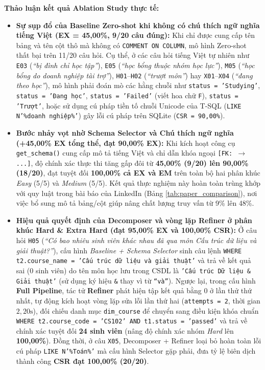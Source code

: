 \documentclass[12pt,a4paper]{report}
\begin{document}
\noindent\textbf{Thảo luận kết quả Ablation Study thực tế:}
\begin{itemize}
    \item \textbf{Sự sụp đổ của Baseline Zero-shot khi không có chú thích ngữ nghĩa tiếng Việt (EX = 45,00\%, 9/20 câu đúng):} Khi chỉ được cung cấp tên bảng và tên cột thô mà không có \texttt{COMMENT ON COLUMN}, mô hình Zero-shot thất bại trên 11/20 câu hỏi. Cụ thể, ở các câu hỏi tiếng Việt tự nhiên như \texttt{E03} (\textit{``bị đình chỉ học tập''}), \texttt{E05} (\textit{``học bổng thuộc nhóm học lực''}), \texttt{M05} (\textit{``học bổng do doanh nghiệp tài trợ''}), \texttt{H01}--\texttt{H02} (\textit{``trượt môn''}) hay \texttt{X01}--\texttt{X04} (\textit{``đang theo học''}), mô hình phải đoán mò các hằng chuỗi như \texttt{status = 'Studying'}, \texttt{status = 'Đang học'}, \texttt{status = 'Failed'} (viết hoa chữ \texttt{F}), \texttt{status = 'Trượt'}, hoặc sử dụng cú pháp tiền tố chuỗi Unicode của T-SQL (\texttt{LIKE N'\%doanh nghiệp\%'}) gây lỗi cú pháp trên SQLite (\texttt{CSR = 90,00\%}).
    \item \textbf{Bước nhảy vọt nhờ Schema Selector và Chú thích ngữ nghĩa (+45,00\% EX tổng thể, đạt 90,00\% EX):} Khi kích hoạt công cụ \texttt{get\_schema()} cung cấp mô tả tiếng Việt và chỉ dẫn khóa ngoại \texttt{[FK: $\rightarrow$ ...]}, độ chính xác thực thi tăng gấp đôi từ \textbf{45,00\% (9/20) lên 90,00\% (18/20)}, đạt tuyệt đối \textbf{100,00\% cả EX và EM} trên toàn bộ hai phân khúc \textit{Easy} (5/5) và \textit{Medium} (5/5). Kết quả thực nghiệm này hoàn toàn trùng khớp với quy luật trong bài báo của LinkedIn \cite{chen2025enterprise} (Bảng \ref{tab:paper_comparison}), nơi việc bổ sung mô tả bảng/cột giúp nâng chất lượng truy vấn từ 9\% lên 48\%.
    \item \textbf{Hiệu quả quyết định của Decomposer và vòng lặp Refiner ở phân khúc Hard \& Extra Hard (đạt 95,00\% EX và 100,00\% CSR):} Ở câu hỏi \texttt{H05} (\textit{``Có bao nhiêu sinh viên khác nhau đã qua môn Cấu trúc dữ liệu và giải thuật?''}), cấu hình \textit{Baseline + Schema Selector} sinh câu lệnh \texttt{WHERE t2.course\_name = 'Cấu trúc dữ liệu và giải thuật'} và trả về kết quả sai ($0$ sinh viên) do tên môn học lưu trong CSDL là \texttt{'Cấu trúc Dữ liệu \& Giải thuật'} (sử dụng ký hiệu \texttt{\&} thay vì từ \texttt{``và''}). Ngược lại, trong cấu hình \textbf{Full Pipeline}, tác tử \textbf{Refiner} phát hiện tập kết quả bằng $0$ ở lần thử thứ nhất, tự động kích hoạt vòng lặp sửa lỗi lần thứ hai (\texttt{attempts = 2}, thời gian $2{,}20\text{s}$), đối chiếu danh mục \texttt{dim\_course} để chuyển sang điều kiện khóa chuẩn \texttt{WHERE t2.course\_code = 'CS102' AND t1.status = 'passed'} và trả về chính xác tuyệt đối \textbf{24 sinh viên} (nâng độ chính xác nhóm \textit{Hard} lên \textbf{100,00\%}). Đồng thời, ở câu \texttt{X05}, Decomposer + Refiner loại bỏ hoàn toàn lỗi cú pháp \texttt{LIKE N'\%Toán\%'} mà cấu hình Selector gặp phải, đưa tỷ lệ biên dịch thành công \textbf{CSR đạt 100,00\% (20/20)}.
\end{itemize}
\end{document}
